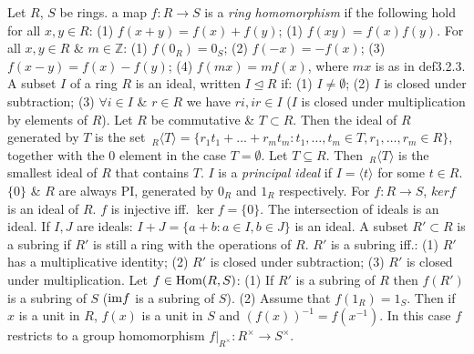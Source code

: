  Let $R$, $S$ be rings. a map $f : R \rightarrow S$ is a \emph{ring homomorphism} if the following hold for all $x, y \in R$:
(1) $f(x + y) = f(x) + f(y)$;
(1) $f(xy) = f(x)f(y)$.
 For all $x, y \in R$ \& $m \in \mathbb{Z}$:
(1) $f(0_R) = 0_S$;
(2) $f(-x) = -f(x)$;
(3) $f(x - y) = f(x) - f(y)$;
(4) $f(mx) = mf(x)$, where $mx$ is as in def3.2.3.
 A subset $I$ of a ring $R$ is an ideal, written $I \trianglelefteq R$ if:
(1) $I \ne \emptyset$;
(2) $I$ is closed under subtraction;
(3) $\forall i \in I$ \& $r \in R$ we have $ri, ir \in I$ ($I$ is closed under multiplication by elements of $R$).
 Let $R$ be commutative \& $T \subset R$. Then the ideal of $R$ generated by $T$ is the set $\,_R\langle T \rangle = \{r_1t_1 + \dots + r_mt_m : t_1, \dots, t_m \in T, r_1, \dots, r_m \in R\}$, together with the 0 element in the case $T = \emptyset$.
 Let $T \subseteq R$. Then $\,_R\langle T \rangle$ is the smallest ideal of $R$ that contains $T$. 
 $I$ is a \emph{principal ideal} if $I = \langle t \rangle$ for some $t \in R$. $\{0\}$ \& $R$ are always PI, generated by $0_R$ and $1_R$ respectively.
 For $f : R \to S$, $ker f$ is an ideal of $R$.
 $f$ is injective iff. $\ker f = \{0\}$.
 The intersection of ideals is an ideal.
 If $I, J$ are ideals: $I + J = \{a + b : a \in I, b \in J\}$ is an ideal.
 A subset $R' \subset R$ is a subring if $R'$ is still a ring with the operations of $R$.
 $R'$ is a subring iff.:
(1) $R'$ has a multiplicative identity;
(2) $R'$ is closed under subtraction;
(3) $R'$ is closed under multiplication.
 Let $f \in \text{Hom}(R, S)$:
(1) If $R'$ is a subring of $R$ then $f(R')$ is a subring of $S$ ($\text{im} f$ is a subring of $S$).
(2) Assume that $f(1_R) = 1_S$. Then if $x$ is a unit in $R$, $f(x)$ is a unit in $S$ and $(f(x))^{-1} = f(x^{-1})$. In this case $f$ restricts to a group homomorphism $f|_{R^\times} : R^{\times} \to S^{\times}$.